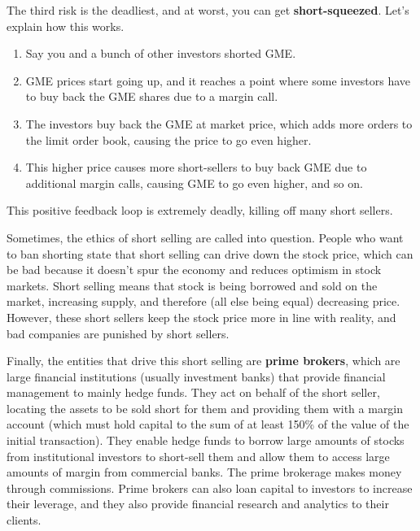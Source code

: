 \documentclass{article}
\begin{document}
    \begin{definition}
      \label{def:short-squeeze}
      The third risk is the deadliest, and at worst, you can get \textbf{short-squeezed}. Let's explain how this works. 
      \begin{enumerate}
        \item Say you and a bunch of other investors shorted GME. 
        \item GME prices start going up, and it reaches a point where some investors have to buy back the GME shares due to a margin call. 
        \item The investors buy back the GME at market price, which adds more orders to the limit order book, causing the price to go even higher.
        \item This higher price causes more short-sellers to buy back GME due to additional margin calls, causing GME to go even higher, and so on.
      \end{enumerate}
      This positive feedback loop is extremely deadly, killing off many short sellers. 
    \end{definition}

    Sometimes, the ethics of short selling are called into question. People who want to ban shorting state that short selling can drive down the stock price, which can be bad because it doesn't spur the economy and reduces optimism in stock markets. Short selling means that stock is being borrowed and sold on the market, increasing supply, and therefore (all else being equal) decreasing price. However, these short sellers keep the stock price more in line with reality, and bad companies are punished by short sellers. 

    Finally, the entities that drive this short selling are \textbf{prime brokers}, which are large financial institutions (usually investment banks) that provide financial management to mainly hedge funds. They act on behalf of the short seller, locating the assets to be sold short for them and providing them with a margin account (which must hold capital to the sum of at least 150\% of the value of the initial transaction). They enable hedge funds to borrow large amounts of stocks from institutional investors to short-sell them and allow them to access large amounts of margin from commercial banks. The prime brokerage makes money through commissions. Prime brokers can also loan capital to investors to increase their leverage, and they also provide financial research and analytics to their clients. 
\end{document}
